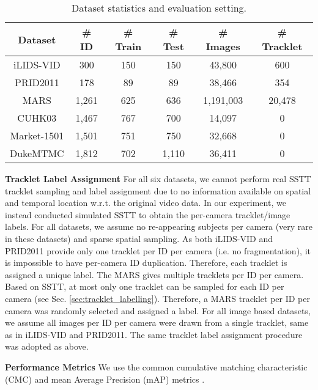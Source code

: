 \documentclass[runningheads]{llncs}
\begin{document}
\begin{table}[h] 
	\centering
	\setlength{\tabcolsep}{0.25cm}
	\caption{
		Dataset statistics and
		evaluation setting.
	}
	\begin{tabular}{c||c|c|c|c|c}
		\hline 
		Dataset  & 
		{\# ID} & 
		{\# Train } & 
		{\# Test} &
		{\# Images} & 
		{\# Tracklet} \\ \hline \hline
		iLIDS-VID \cite{wang2014person}
		& 300 & 150 & 150 & 43,800 & 600 \\
		PRID2011 \cite{hirzer2011person}
		& 178 & 89 & 89 & 38,466 & 354 \\
		MARS \cite{zheng2016mars} 
		& 1,261 & 625 & 636 & 1,191,003 & 20,478 \\ 
		\hline
		CUHK03 \cite{li2014deepreid}
		& 1,467 & 767 & 700 & 14,097 & 0 \\
		Market-1501 \cite{zheng2015scalable}
		& 1,501& 751 & 750  & 32,668 & 0 \\
		DukeMTMC \cite{ristani2016MTMC}
		& 1,812 & 702 & 1,110 & 36,411 & 0\\
		\hline
	\end{tabular}
	\label{tab:dataset_stats}
\end{table}

\noindent \textbf{Tracklet Label Assignment }
For all six datasets, we cannot perform real SSTT tracklet sampling
and label assignment due to
no information available on spatial and temporal location w.r.t. the original video data.
In our experiment, we instead conducted simulated SSTT to 
obtain the per-camera tracklet/image labels.  
For all datasets, we assume no re-appearing subjects per camera (very
rare in these datasets)
and sparse spatial sampling.
As both iLIDS-VID and PRID2011
provide only one tracklet per ID per camera (i.e. no fragmentation),
it is impossible to have per-camera ID duplication.
Therefore, each tracklet is assigned a unique label.
The MARS gives multiple tracklets per ID per camera. 
Based on SSTT,
at most only one tracklet can be sampled for each ID per camera
(see Sec. \ref{sec:tracklet_labelling}).
Therefore, a MARS tracklet per ID per camera was randomly selected and
assigned a label.
For all {image based datasets}, 
we assume all images per ID per camera were drawn from 
a single tracklet, same as in iLIDS-VID and PRID2011.
The same tracklet label assignment procedure was adopted as above.

\noindent \textbf{Performance Metrics } 
We use the common cumulative matching characteristic (CMC) and mean Average Precision (mAP) metrics \cite{zheng2015scalable}.
\end{document}
